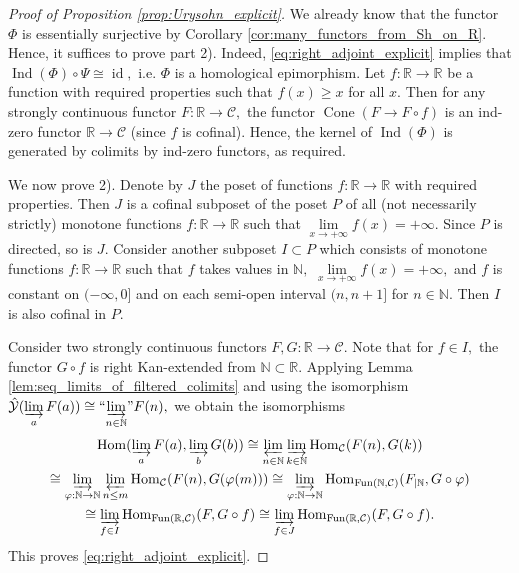 \documentclass[11pt,leqno]{amsart}
\numberwithin{equation}{section}
\def\N{\mathbb{N}}
\def\R{\mathbb{R}}
\def\Hom{\operatorname{Hom}}
\newcommand{\indlim}[1][]{\mathop{\varinjlim}\limits_{#1}}
\newcommand{\inddlim}[1][]{{``{\indlim[#1]}"}}
\newcommand{\prolim}[1][]{\mathop{\varprojlim}\limits_{#1}}
\newcommand{\Cone}{\operatorname{Cone}}
\newcommand{\strcont}{\operatorname{strcont}}
\newcommand{\cD}{{\mathcal D}}
\newcommand{\cC}{{\mathcal C}}
\newcommand{\cY}{{\mathcal Y}}
\newcommand{\Fun}{\operatorname{Fun}}
\newcommand{\Ind}{\operatorname{Ind}}
\newcommand{\id}{\operatorname{id}}
\begin{document}
\begin{proof}[Proof of Proposition \ref{prop:Urysohn_explicit}] We already know that the functor $\Phi$ is essentially surjective by Corollary \ref{cor:many_functors_from_Sh_on_R}. Hence, it suffices to prove part 2). Indeed, \eqref{eq:right_adjoint_explicit} implies that $\Ind(\Phi)\circ\Psi\cong\id,$ i.e. $\Phi$ is a homological epimorphism. Let $f:\R\to\R$ be a function with required properties such that $f(x)\geq x$ for all $x.$ Then for any strongly continuous functor $F:\R\to\cC,$ the functor $\Cone(F\to F\circ f)$ is an ind-zero functor $\R\to\cC$ (since $f$ is cofinal). Hence, the kernel of $\Ind(\Phi)$ is generated by colimits by ind-zero functors, as required.

We now prove 2).  Denote by $J$ the poset of functions $f:\R\to\R$ with required properties. Then $J$ is a cofinal subposet of the poset $P$ of all (not necessarily strictly) monotone functions $f:\R\to\R$ such that $\lim\limits_{x\to+\infty}f(x)=+\infty.$ Since $P$ is directed, so is $J.$ Consider another subposet $I\subset P$ which consists of monotone functions $f:\R\to\R$ such that $f$ takes values in $\N,$ $\lim\limits_{x\to+\infty} f(x)=+\infty,$ and $f$ is constant on $(-\infty,0]$ and on each semi-open interval $(n,n+1]$ for $n\in\N.$ Then $I$ is also cofinal in $P.$

Consider two strongly continuous functors $F,G:\R\to\cC.$ Note that for $f\in I,$ the functor $G\circ f$ is right Kan-extended from $\N\subset\R.$ Applying Lemma \ref{lem:seq_limits_of_filtered_colimits} and using the isomorphism $\hat{\cY}(\indlim[a]F(a))\cong\inddlim[n\in\N]F(n),$ we obtain the isomorphisms
\begin{multline*}\Hom(\indlim[a]F(a),\indlim[b]G(b))\cong\prolim[n\in\N]\indlim[k\in \N]\Hom_{\cC}(F(n),G(k))\\ \cong
\indlim[\varphi:\N\to\N]\prolim[n\leq m]\Hom_{\cC}(F(n),G(\varphi(m)))\cong \indlim[\varphi:\N\to \N]\Hom_{\Fun(\N,\cC)}(F_{\mid \N},G\circ\varphi)\\ \cong
\indlim[f\in I]\Hom_{\Fun(\R,\cC)}(F,G\circ f)\cong\indlim[f\in J]\Hom_{\Fun(\R,\cC)}(F,G\circ f).\end{multline*} This proves \eqref{eq:right_adjoint_explicit}.
\end{proof}

\end{document}
